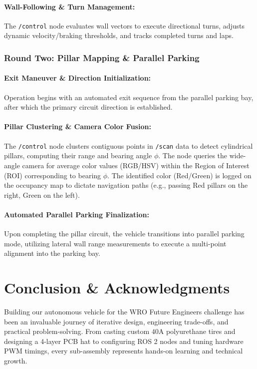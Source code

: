 \documentclass[12pt,a4paper]{article}
\begin{document}
\paragraph{Wall-Following \& Turn Management:} The \texttt{/control} node evaluates wall vectors to execute directional turns, adjusts dynamic velocity/braking thresholds, and tracks completed turns and laps.

\subsubsection{Round Two: Pillar Mapping \& Parallel Parking}
\paragraph{Exit Maneuver \& Direction Initialization:} Operation begins with an automated exit sequence from the parallel parking bay, after which the primary circuit direction is established.

\paragraph{Pillar Clustering \& Camera Color Fusion:} The \texttt{/control} node clusters contiguous points in \texttt{/scan} data to detect cylindrical pillars, computing their range and bearing angle $\phi$. The node queries the wide-angle camera for average color values (RGB/HSV) within the Region of Interest (ROI) corresponding to bearing $\phi$. The identified color (Red/Green) is logged on the occupancy map to dictate navigation paths (e.g., passing Red pillars on the right, Green on the left).

\paragraph{Automated Parallel Parking Finalization:} Upon completing the pillar circuit, the vehicle transitions into parallel parking mode, utilizing lateral wall range measurements to execute a multi-point alignment into the parking bay.

\pagebreak

\section{Conclusion \& Acknowledgments}

Building our autonomous vehicle for the WRO Future Engineers challenge has been an invaluable journey of iterative design, engineering trade-offs, and practical problem-solving. From casting custom $40\text{A}$ polyurethane tires and designing a 4-layer PCB hat to configuring ROS 2 nodes and tuning hardware PWM timings, every sub-assembly represents hands-on learning and technical growth.
\end{document}
